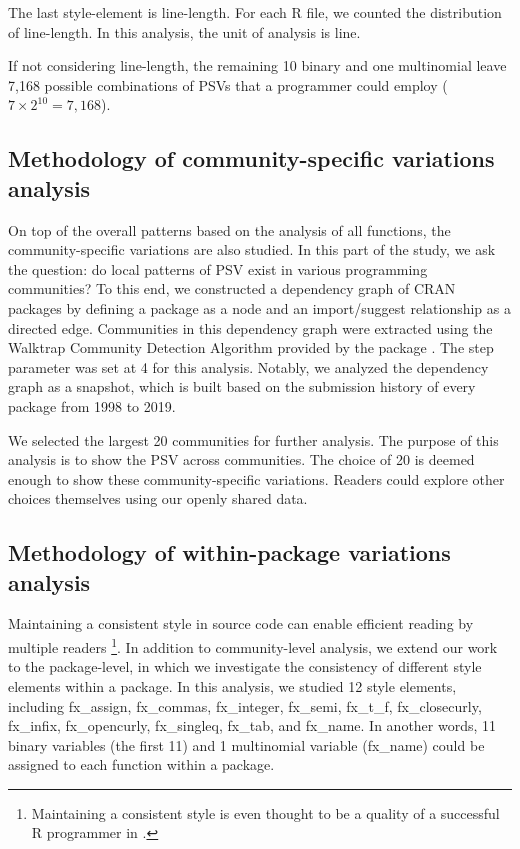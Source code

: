 The last style-element is line-length. For each R file, we counted the distribution of line-length. In this analysis, the unit of analysis is line.

If not considering line-length, the remaining 10 binary and one multinomial leave 7,168 possible combinations of PSVs that a programmer could employ ($7 \times 2^{10} = 7,168$).

\subsection{Methodology of community-specific variations analysis}

On top of the overall patterns based on the analysis of all functions, the community-specific variations are also studied. In this part of the study, we ask the question: do local patterns of PSV exist in various programming communities? To this end, we constructed a dependency graph of CRAN packages by defining a package as a node and an import/suggest relationship as a directed edge. Communities in this dependency graph were extracted using the Walktrap Community Detection Algorithm \citep{pons} provided by the  package \citep{csardi}. The step parameter was set at 4 for this analysis. Notably, we analyzed the dependency graph as a snapshot, which is built based on the submission history of every package from 1998 to 2019. 

We selected the largest 20 communities for further analysis. The purpose of this analysis is to show the PSV across communities. The choice of 20 is deemed enough to show these community-specific variations. Readers could explore other choices themselves using our openly shared data.

\subsection{Methodology of within-package variations analysis}

Maintaining a consistent style in source code can enable efficient reading by multiple readers \citep{gillespie2016efficient} \footnote{Maintaining a consistent style is even thought to be a quality of a successful R programmer in \citet{gillespie2016efficient}.}. In addition to community-level analysis, we extend our work to the package-level, in which we investigate the consistency of different style elements within a package. In this analysis, we studied 12 style elements, including fx\_assign, fx\_commas, fx\_integer, fx\_semi, fx\_t\_f, fx\_closecurly, fx\_infix, fx\_opencurly, fx\_singleq, fx\_tab, and fx\_name.  In another words, 11 binary variables (the first 11) and 1 multinomial variable (fx\_name) could be assigned to each function within a package.


